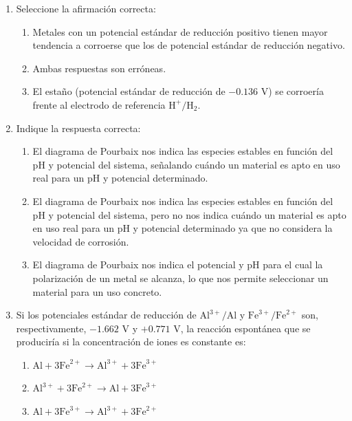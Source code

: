 \begin{enumerate}
    \item Seleccione la afirmación correcta:
          \begin{enumerate}[label=\alph*.]
              \item Metales con un potencial estándar de reducción positivo tienen mayor tendencia a corroerse que los de potencial estándar de reducción negativo.
              \item Ambas respuestas son erróneas.
              \item \textcolor{red!85!black}{El estaño (potencial estándar de reducción de $-0.136\text{ V}$) se corroería frente al electrodo de referencia $\text{H}^+/\text{H}_2$.}
          \end{enumerate}

    \item Indique la respuesta correcta:
          \begin{enumerate}[label=\alph*.]
              \item El diagrama de Pourbaix nos indica las especies estables en función del pH y potencial del sistema, señalando cuándo un material es apto en uso real para un pH y potencial determinado.
              \item \textcolor{red!85!black}{El diagrama de Pourbaix nos indica las especies estables en función del pH y potencial del sistema, pero no nos indica cuándo un material es apto en uso real para un pH y potencial determinado ya que no considera la velocidad de corrosión.}
              \item El diagrama de Pourbaix nos indica el potencial y pH para el cual la polarización de un metal se alcanza, lo que nos permite seleccionar un material para un uso concreto.
          \end{enumerate}

    \item Si los potenciales estándar de reducción de $\text{Al}^{3+}/\text{Al}$ y $\text{Fe}^{3+}/\text{Fe}^{2+}$ son, respectivamente, $-1.662\text{ V}$ y $+0.771\text{ V}$, la reacción espontánea que se produciría si la concentración de iones es constante es:
          \begin{enumerate}[label=\alph*.]
              \item $\text{Al} + 3\text{Fe}^{2+} \longrightarrow \text{Al}^{3+} + 3\text{Fe}^{3+}$
              \item $\text{Al}^{3+} + 3\text{Fe}^{2+} \longrightarrow \text{Al} + 3\text{Fe}^{3+}$
              \item \textcolor{red!85!black}{$\text{Al} + 3\text{Fe}^{3+} \longrightarrow \text{Al}^{3+} + 3\text{Fe}^{2+}$}
          \end{enumerate}
\end{enumerate}
